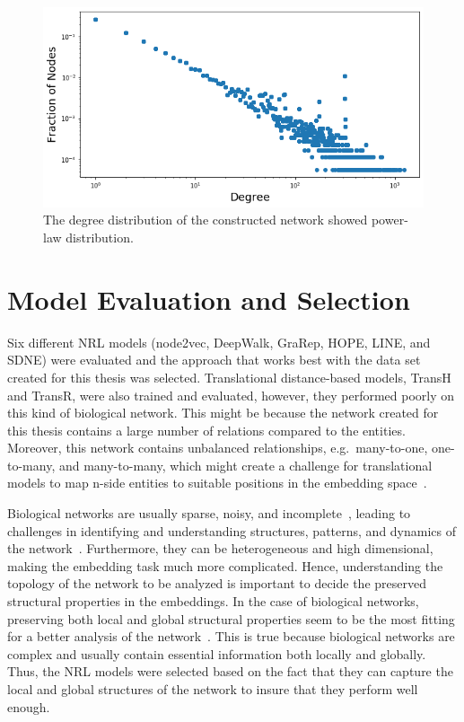 \begin{figure}[!h]
    \centering
    \includegraphics[scale=0.5]
    {figures/degree_distribution.png}
    \captionsetup{justification=centering}
    \caption[Degree distribution of network]{\label{fig:degree_distribution}The degree distribution of the constructed network showed power-law distribution.}
\end{figure}

\section{Model Evaluation and Selection}

Six different \ac{NRL} models (node2vec, DeepWalk, \ac{GraRep}, \ac{HOPE}, \ac{LINE}, and \ac{SDNE}) were evaluated and the approach that works best with the data set created for this thesis was selected.
Translational distance-based models, TransH and TransR, were also trained and evaluated, however, they performed poorly on this kind of biological network.
This might be because the network created for this thesis contains a large number of relations compared to the entities.
Moreover, this network contains unbalanced relationships, e.g.\ many-to-one, one-to-many, and many-to-many, which might create a challenge for translational models to map n-side entities to suitable positions in the embedding space~\cite{liang_predicting_2019}.

Biological networks are usually sparse, noisy, and incomplete~\cite{nickel_review_2016}, leading to challenges in identifying and understanding structures, patterns, and dynamics of the network~\cite{wang_unsupervised_2016}.
Furthermore, they can be heterogeneous and high dimensional, making the embedding task much more complicated.
Hence, understanding the topology of the network to be analyzed is important to decide the preserved structural properties in the embeddings.
In the case of biological networks, preserving both local and global structural properties seem to be the most fitting for a better analysis of the network~\cite{su_network_2018}.
This is true because biological networks are complex and usually contain essential information both locally and globally.
Thus, the \ac{NRL} models were selected based on the fact that they can capture the local and global structures of the network to insure that they perform well enough.

